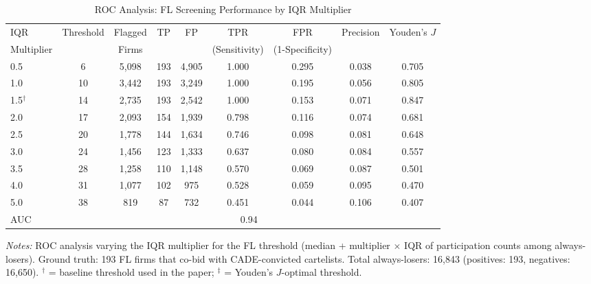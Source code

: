 \begin{table}[htbp]
\centering
\caption{ROC Analysis: FL Screening Performance by IQR Multiplier}
\label{tab:roc_detection}
\begin{adjustbox}{max width=\textwidth}
\begin{threeparttable}
\small
\begin{tabular}{lcccccccc}
\toprule
IQR & Threshold & Flagged & TP & FP & TPR & FPR & Precision & Youden's $J$ \\
Multiplier & & Firms & & & (Sensitivity) & (1-Specificity) & & \\
\midrule
0.5 & 6 & 5,098 & 193 & 4,905 & 1.000 & 0.295 & 0.038 & 0.705 \\
1.0 & 10 & 3,442 & 193 & 3,249 & 1.000 & 0.195 & 0.056 & 0.805 \\
1.5$^{\dagger}$ & 14 & 2,735 & 193 & 2,542 & 1.000 & 0.153 & 0.071 & 0.847 \\
2.0 & 17 & 2,093 & 154 & 1,939 & 0.798 & 0.116 & 0.074 & 0.681 \\
2.5 & 20 & 1,778 & 144 & 1,634 & 0.746 & 0.098 & 0.081 & 0.648 \\
3.0 & 24 & 1,456 & 123 & 1,333 & 0.637 & 0.080 & 0.084 & 0.557 \\
3.5 & 28 & 1,258 & 110 & 1,148 & 0.570 & 0.069 & 0.087 & 0.501 \\
4.0 & 31 & 1,077 & 102 & 975 & 0.528 & 0.059 & 0.095 & 0.470 \\
5.0 & 38 & 819 & 87 & 732 & 0.451 & 0.044 & 0.106 & 0.407 \\
\midrule
AUC & \multicolumn{8}{c}{0.94} \\
\bottomrule
\end{tabular}
\begin{tablenotes}
\small
\item \textit{Notes:} ROC analysis varying the IQR multiplier for the FL
threshold (median + multiplier $\times$ IQR of participation counts among
always-losers). Ground truth: 193 FL firms that co-bid with CADE-convicted
cartelists. Total always-losers: 16,843 (positives: 193,
negatives: 16,650).
$^{\dagger}$ = baseline threshold used in the paper;
$^{\ddagger}$ = Youden's $J$-optimal threshold.
\end{tablenotes}
\end{threeparttable}
\end{adjustbox}
\end{table}